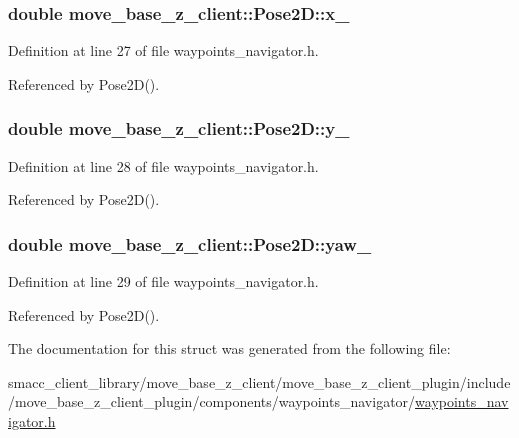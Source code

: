 \subsubsection[{\texorpdfstring{x\+\_\+}{x_}}]{\setlength{\rightskip}{0pt plus 5cm}double move\+\_\+base\+\_\+z\+\_\+client\+::\+Pose2\+D\+::x\+\_\+}\hypertarget{structmove__base__z__client_1_1Pose2D_a92b53110c2fdd77c18275d6e16709581}{}\label{structmove__base__z__client_1_1Pose2D_a92b53110c2fdd77c18275d6e16709581}


Definition at line 27 of file waypoints\+\_\+navigator.\+h.



Referenced by Pose2\+D().

\subsubsection[{\texorpdfstring{y\+\_\+}{y_}}]{\setlength{\rightskip}{0pt plus 5cm}double move\+\_\+base\+\_\+z\+\_\+client\+::\+Pose2\+D\+::y\+\_\+}\hypertarget{structmove__base__z__client_1_1Pose2D_a10e59f372c758bffb00bfaaca43ec1fc}{}\label{structmove__base__z__client_1_1Pose2D_a10e59f372c758bffb00bfaaca43ec1fc}


Definition at line 28 of file waypoints\+\_\+navigator.\+h.



Referenced by Pose2\+D().

\subsubsection[{\texorpdfstring{yaw\+\_\+}{yaw_}}]{\setlength{\rightskip}{0pt plus 5cm}double move\+\_\+base\+\_\+z\+\_\+client\+::\+Pose2\+D\+::yaw\+\_\+}\hypertarget{structmove__base__z__client_1_1Pose2D_a75fda2f20515d0acdb83d33017e6c97e}{}\label{structmove__base__z__client_1_1Pose2D_a75fda2f20515d0acdb83d33017e6c97e}


Definition at line 29 of file waypoints\+\_\+navigator.\+h.



Referenced by Pose2\+D().



The documentation for this struct was generated from the following file\+:\begin{DoxyCompactItemize}
\item 
smacc\+\_\+client\+\_\+library/move\+\_\+base\+\_\+z\+\_\+client/move\+\_\+base\+\_\+z\+\_\+client\+\_\+plugin/include/move\+\_\+base\+\_\+z\+\_\+client\+\_\+plugin/components/waypoints\+\_\+navigator/\hyperlink{waypoints__navigator_8h}{waypoints\+\_\+navigator.\+h}\end{DoxyCompactItemize}

